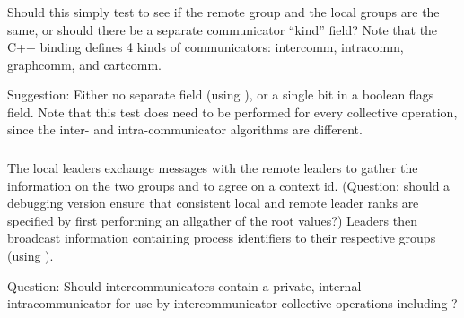\documentclass{article}
\begin{document}
\subsubsection{}
Should this simply test to see if the remote group and the local groups are
the same, or should there be a separate communicator ``kind'' field?  Note
that the C++ binding defines 4 kinds of communicators: intercomm, intracomm,
graphcomm, and cartcomm. 

Suggestion: Either no separate field (using
 \code{==}
), or a single bit in a boolean flags field.  
Note that this test does need to be performed for every collective operation,
since the inter- and intra-communicator algorithms are different.

\subsubsection{}
The local leaders exchange messages with the remote leaders to gather the
information on the two groups and to agree on a context id.  (Question: should
a debugging version ensure 
that consistent local and remote leader ranks are specified by first
performing an allgather of the root values?)  
Leaders then broadcast information containing process identifiers to
their respective groups (using 
). 

Question:  Should intercommunicators contain a private, internal
intracommunicator for use by intercommunicator collective operations including
?
\end{document}
